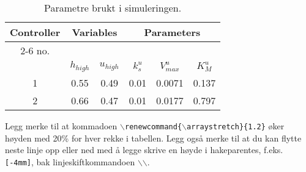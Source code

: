 \begin{table}[H]
  \centering
  \renewcommand{\arraystretch}{1.2}
  \caption{Parametre brukt i simuleringen.}
  \begin{tabular}{|c||c|c||c|c|c|}\hline
    \multirow{2}{*}{Controller} & \multicolumn{2}{c||}{Variables} & \multicolumn{3}{c|}{Parameters}\\
    \cline{2-6}
    no. & \cellcolor[gray]{0.8} & & & &\\[-4mm]
          & \cellcolor[gray]{0.8}  $h_{high}$ &$u_{high}$  & $k_{s}^{u}$  
                                & $V_{max}^{u}$ &    $K_{M}^{u}$  \\[1mm]\hline
    1 & \cellcolor[gray]{0.8} 0.55 & 0.49 & 0.01 & 0.0071  & 0.137 \\
    2 & \cellcolor[gray]{0.8} 0.66 & 0.47 & 0.01 & 0.0177  & 0.797 \\\hline
  \end{tabular}
  \label{tab:avansert_tab}
\end{table}

Legg merke til at kommadoen
{\tt $\backslash$renewcommand\{$\backslash$arraystretch\}\{1.2\}} 
øker høyden med 20\% for hver rekke i tabellen. Legg også merke til at
du kan flytte neste linje opp eller ned med å legge skrive en høyde i
hakeparentes, f.eks.
{\tt  [-4mm]}, bak linjeskiftkommandoen $\backslash$$\backslash$.